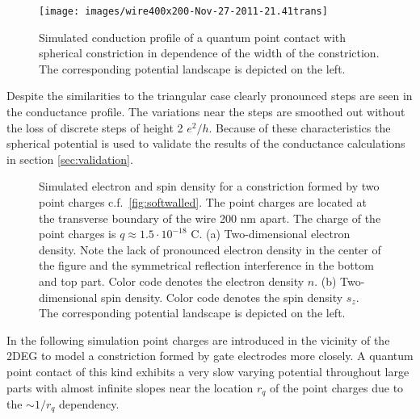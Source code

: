 \begin{figure}[h]
  \centering
  \texttt{[image: images/wire400x200-Nov-27-2011-21.41trans]}
  \caption{Simulated conduction profile of a quantum point contact with spherical constriction in dependence of the width of the constriction. The corresponding potential landscape is depicted on the left.}\label{fig:sphericaltrans}
\end{figure}
Despite the similarities to the triangular case clearly pronounced steps are seen in the conductance profile. The variations near the steps are smoothed out without the loss of discrete steps of height 2 $e^2/h$. Because of these characteristics the spherical potential is used to validate the results of the conductance calculations in section \ref{sec:validation}.\par
\begin{figure}[h]
  \caption{Simulated electron and spin density for a constriction formed by two point charges c.f.~\cref{fig:softwalled}. The point charges are located at the transverse boundary of the wire 200 nm apart. The charge of the point charges is $q\approx 1.5\cdot 10^{-18}$ C. (a) Two-dimensional electron density. Note the lack of pronounced electron density in the center of the figure and the symmetrical reflection interference in the bottom and top part. Color code denotes the electron density $n$. (b) Two-dimensional spin density. Color code denotes the spin density $s_z$. The corresponding potential landscape is depicted on the left.}
\end{figure}
In the following simulation point charges are introduced in the vicinity of the 2DEG to model a constriction formed by gate electrodes more closely. A quantum point contact of this kind exhibits a very slow varying potential throughout large parts with almost infinite slopes near the location $r_q$ of the point charges due to the $\sim 1/r_q$ dependency.\par
